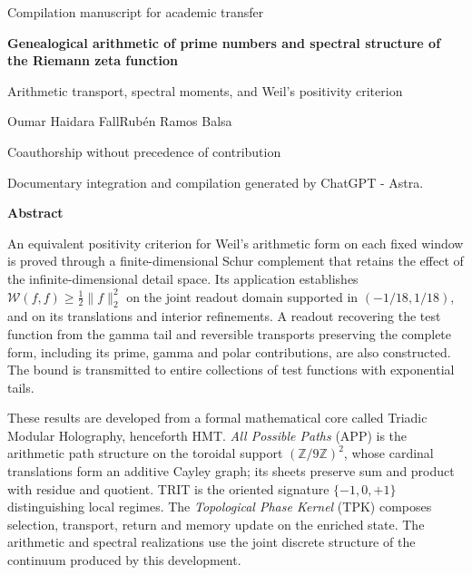 \thispagestyle{plain}
\begin{center}
{\fontsize{10}{12}\selectfont Compilation manuscript for academic transfer\par}
\vspace{6mm}
{\fontsize{17}{20.5}\selectfont\bfseries Genealogical arithmetic of prime numbers and spectral structure of the Riemann zeta function\par}
\vspace{7pt}
{\fontsize{12}{14.5}\selectfont Arithmetic transport, spectral moments, and Weil's positivity criterion\par}
\vspace{8pt}
{\fontsize{11.5}{14}\selectfont Oumar Haidara Fall\space\textperiodcentered\space Rubén Ramos Balsa\par}
\vspace{4pt}
{\fontsize{8}{10}\selectfont Coauthorship without precedence of contribution\par}
\vspace{4pt}
{\fontsize{8}{10}\selectfont Documentary integration and compilation generated by ChatGPT - Astra.\par}
\end{center}
\vspace{3pt}
{}
\begin{center}\bfseries Abstract\end{center}
\begingroup\fontsize{10.5}{12.8}\selectfont
An equivalent positivity criterion for Weil's arithmetic form on each
fixed window is proved through a finite-dimensional Schur complement
that retains the effect of the infinite-dimensional detail space.
Its application establishes
$\mathscr W(f,f)\geq\frac12\|f\|_2^2$ on the joint readout
domain supported in $(-1/18,1/18)$, and on its translations and
interior refinements. A readout recovering the test function from
the gamma tail and reversible transports preserving the complete
form, including its prime, gamma and polar contributions, are also
constructed. The bound is transmitted to entire collections of test
functions with exponential tails.

These results are developed from a formal mathematical core
called Triadic Modular Holography, henceforth HMT.
\emph{All Possible Paths} (APP) is the arithmetic path structure
on the toroidal support $(\mathbb Z/9\mathbb Z)^2$, whose
cardinal translations form an additive Cayley graph; its sheets
preserve sum and product with residue and quotient. TRIT is the
oriented signature $\{-1,0,+1\}$ distinguishing local regimes.
The \emph{Topological Phase Kernel} (TPK) composes selection,
transport, return and memory update on the enriched state.
The arithmetic and spectral realizations use the joint discrete
structure of the continuum produced by this development.

